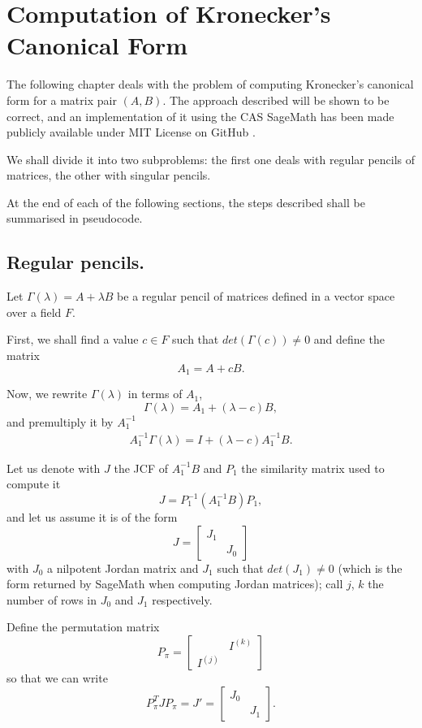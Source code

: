 \section{Computation of Kronecker's Canonical Form}
The following chapter deals with the problem of computing Kronecker's canonical form for a matrix pair \((A, B)\).
The approach described will be shown to be correct, and an implementation
of it using the CAS SageMath has been made publicly available under MIT License on GitHub
\cite{Trapani_Computation_of_Kronecker_s}.


We shall divide it into two subproblems: the first one deals with regular pencils of matrices, the other with
singular pencils.

At the end of each of the following sections, the steps described shall be summarised in pseudocode.

\subsection*{Regular pencils.}
Let \(\Gamma(\lambda) = A + \lambda B\) be a regular pencil of matrices defined in a vector space over a
field \(F\).

First, we shall find a value \(c \in F\) such that \(det(\Gamma(c)) \neq 0\) and define the matrix 
\[
    A_{1} = A + cB.
\]

Now, we rewrite \(\Gamma(\lambda)\) in terms of \(A_{1}\),
\[
    \Gamma(\lambda) = A_{1} + (\lambda - c)B,
\]
and premultiply it by \(A_{1}^{-1}\)
\begin{gather}
    A_{1}^{-1} \Gamma(\lambda) = I + (\lambda - c)A_{1}^{-1}B. \label{gamma-reg-1}
\end{gather}

Let us denote with \(J\) the JCF of \(A_{1}^{-1}B\) and \(P_{1}\) the similarity matrix used to compute it
\[
    J = P_{1}^{-1}(A_{1}^{-1}B)P_{1},
\]
and let us assume it is of the form
\[
    J =
    \begin{bmatrix}
        J_{1} & \\
        & J_{0}
    \end{bmatrix}
\]
with \(J_{0}\) a nilpotent Jordan matrix and \(J_{1}\) such that \(det(J_{1}) \neq 0\) (which is the form returned by
SageMath when computing Jordan matrices); call \(j\), \(k\) the number of rows in \(J_{0}\) and \(J_{1}\) respectively.

Define the permutation matrix
\[
    P_{\pi} =
    \begin{bmatrix}
        & I^{(k)}\\
        I^{(j)} &
    \end{bmatrix}
\]
so that we can write
\[
    P_{\pi}^T J P_{\pi} = J' =
    \begin{bmatrix}
        J_{0} & \\
        & J_{1}
    \end{bmatrix}.
\]

